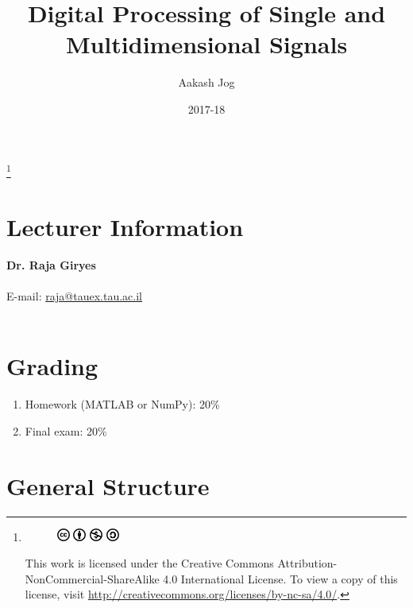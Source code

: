 \documentclass[titlepage, fleqn, a4paper, 12pt, twoside]{article}
\title{Digital Processing of Single and Multidimensional Signals}
\author{Aakash Jog}
\date{2017-18}
\theoremstyle{definition}
\theoremstyle{theorem}
\newcommand\blfootnote[1]{%
	\begingroup
	\renewcommand\thefootnote{}\footnote{#1}%
	\addtocounter{footnote}{-1}%
	\endgroup
}
\begin{document}
\begin{titlepage}
\maketitle
\end{titlepage}
\restoregeometry

\blfootnote
{
	\begin{figure}[H]
		\includegraphics[height = 12pt]{cc.pdf}
		\includegraphics[height = 12pt]{by.pdf}
		\includegraphics[height = 12pt]{nc.pdf}
		\includegraphics[height = 12pt]{sa.pdf}
	\end{figure}
	This work is licensed under the Creative Commons Attribution-NonCommercial-ShareAlike 4.0 International License. To view a copy of this license, visit \url{http://creativecommons.org/licenses/by-nc-sa/4.0/}.
} %

\tableofcontents

\clearpage
\section{Lecturer Information}

\textbf{Dr. Raja Giryes}\\
~\\
E-mail: \href{mailto:raja@tauex.tau.ac.il}{raja@tauex.tau.ac.il}\\
~\\

\section{Grading}

\begin{enumerate}
	\item Homework (MATLAB or NumPy): 20\%
	\item Final exam: 20\%
\end{enumerate}

\section{General Structure}
\end{document}
